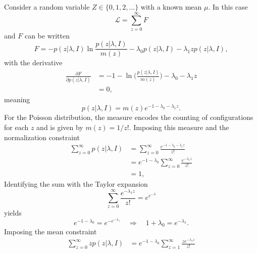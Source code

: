 \begin{example}
	Consider a random variable $Z \in \{0,1,2,\dots\}$ with a known mean $\mu$. In this case
	\begin{equation}
		\mathcal{L} = \sum_{z=0}^\infty F
	\end{equation}
	and $F$ can be written
	\begin{equation}
		F = -p(z|\lambda,I)\ln\frac{p(z|\lambda,I)}{m(z)} - \lambda_0 p(z|\lambda,I) - \lambda_1 z p(z|\lambda,I),
	\end{equation}
	with the derivative
	\begin{equation}
		\begin{split}
			\frac{\partial F}{\partial p(z|\lambda,I)} &= -1 - \ln\bigg(\frac{p(z|\lambda,I)}{m(z)}\bigg) - \lambda_0 - \lambda_1 z \\
			&= 0,
		\end{split}
	\end{equation}
	meaning
	\begin{equation}
		p(z|\lambda,I) = m(z) e^{-1-\lambda_0 - \lambda_1 z}.
		\label{eq:qsa}
	\end{equation}
	For the Poisson distribution, the measure encodes the counting of configurations for each $z$ and is given by $m(z) = 1/z!$. Imposing this measure and the normalization constraint
	\begin{equation}
		\begin{split}
			\sum_{z=0}^{\infty} p(z|\lambda,I) &= \sum_{z=0}^{\infty} \frac{e^{-1-\lambda_0 - \lambda_1 z}}{z!}\\
			& = e^{-1-\lambda_0} \sum_{z=0}^{\infty} \frac{e^{-\lambda_1 z}}{z!}\\
			& = 1,
		\end{split}
		\label{eq:asd}
	\end{equation}
	Identifying the sum with the Taylor expansion
	\begin{equation}
		\sum_{z=0}^{\infty} \frac{e^{-\lambda_1 z}}{z!} = e^{e^{-\lambda}}
	\end{equation}
	yields
	\begin{equation}
		e^{-1-\lambda_0} = e^{-e^{-\lambda_1}} \quad \Rightarrow \quad 1+\lambda_0 = e^{-\lambda_1}.
		\label{eq:qwe}
	\end{equation}
	Imposing the mean constraint
	\begin{equation}
		\begin{split}
			\sum_{z=0}^{\infty} z p(z|\lambda,I)& = e^{-1-\lambda_0} \sum_{z=1}^{\infty} \frac{z e^{-\lambda_1 z}}{z!}\\

\end{split}
\end{equation}
\end{example}
